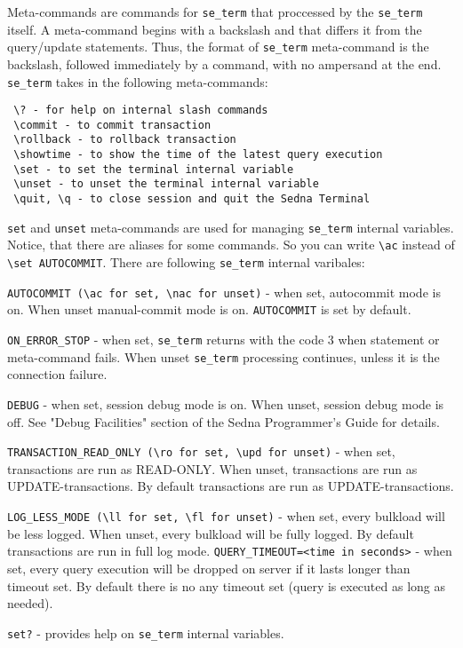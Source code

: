 \documentclass[a4paper,12pt]{article}
\begin{document}
Meta-commands are commands for \verb!se_term! that proccessed by the \verb!se_term! itself.
A meta-command begins with a backslash and that differs it from the query/update statements.
Thus, the format of \verb!se_term! meta-command is the backslash, followed immediately by a command, with no ampersand at the end.
\verb!se_term! takes in the following meta-commands:

\begin{verbatim}
 \? - for help on internal slash commands
 \commit - to commit transaction
 \rollback - to rollback transaction
 \showtime - to show the time of the latest query execution
 \set - to set the terminal internal variable
 \unset - to unset the terminal internal variable
 \quit, \q - to close session and quit the Sedna Terminal
\end{verbatim}

\verb!set! and \verb!unset! meta-commands are used for managing \verb!se_term! internal variables.
Notice, that there are aliases for some commands. So you can write \verb!\ac! instead of \verb!\set AUTOCOMMIT!.
There are following \verb!se_term! internal varibales:

\verb!AUTOCOMMIT (\ac for set, \nac for unset)! - when set, autocommit mode is on. When unset manual-commit mode is on. \verb!AUTOCOMMIT! is set by default.

\verb!ON_ERROR_STOP! - when set, \verb!se_term! returns with the code 3 when statement or meta-command fails. When unset \verb!se_term! processing continues, unless it is the connection failure.

\verb!DEBUG! - when set, session debug mode is on. When unset, session debug mode is off. See "Debug Facilities" section of the Sedna Programmer's Guide for details.

\verb!TRANSACTION_READ_ONLY (\ro for set, \upd for unset)! - when set, transactions are run as READ-ONLY. When unset, transactions are run as UPDATE-transactions. By default transactions are run as UPDATE-transactions.

\verb!LOG_LESS_MODE (\ll for set, \fl for unset)! -  when set, every bulkload will be less logged. When unset, every bulkload will be fully logged. By default transactions are run in full log mode.
\verb!QUERY_TIMEOUT=<time in seconds>! - when set, every query execution will be dropped on server if it lasts longer than timeout set. By default there is no any timeout set (query is executed as long as needed).

\verb!set?! - provides help on \verb!se_term! internal variables.
\end{document}
